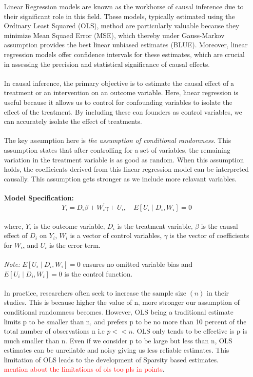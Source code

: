 Linear Regression models are known as the workhorse of causal inference due to their significant role in this field. These models, typically estimated using the Ordinary Least Squared (OLS), method are particularly valuable because they minimize Mean Squaed Error (MSE), which thereby under Gauss-Markov assumption provides the best linear unbiased estimates (BLUE). Moreover, linear regression models offer confidence intervals for these estimates, which are crucial in assessing the precision and statistical significance of causal effects. 
\\
\\
In causal inference, the primary objective is to estimate the causal effect of a treatment or an intervention on an outcome variable. Here, linear regression is useful because it allows us to control for confounding variables to isolate the effect of the treatment. By including these con founders as control variables, we can accurately isolate the effect of treatments. \\
\\
The key assumption here is \textit{the assumption of conditional randomness}. This assumption states that after controlling for a set of variables, the remaining variation in the treatment variable is as good as random. When this assumption holds, the coefficients derived from this linear regression model can be interpreted causally. This assumption gets stronger as we include more relavant variables. 
\\
\\
\textbf{Model Specification:}
\\
\begin{equation}
    Y_i=D_i \beta+W_i^{\prime} \gamma+U_i, \quad E\left[U_i \mid D_i, W_i\right]=0
\end{equation}
\\
\noindent where,
$Y_i$ is the outcome variable, $D_i$ is the treatment variable,
$\beta$ is the causal effect of $D_i$ on $Y_i$, 
$W_i$ is a vector of control variables,
$\gamma$ is the vector of coefficients for $W_i$, and $U_i$ is the error term. \\
\\
\textit{Note:}
$E\left[U_i \mid D_i, W_i\right] = 0$ ensures no omitted variable bias and $E\left[U_i \mid D_i, W_i\right]=0$ is the control function.
\\
\\
In practice, researchers often seek to increase the sample size $(n)$ in their studies. This is because higher the value of n, more stronger our assumption of conditional randomness becomes. However, OLS being a traditional estimate limits p to be smaller than n, and prefers p to be no more than 10 percent of the total number of observations n i.e $p<<n$. OLS only tends to be effective is p is much smaller than n. Even if we consider p to be large but less than n, OLS estimates can be unreliable and noisy giving us less reliable estimates. This limitation of OLS leads to the development of Sparsity based estimates.\\
\textcolor{red}{mention about the limitations of ols too pls in points}.

